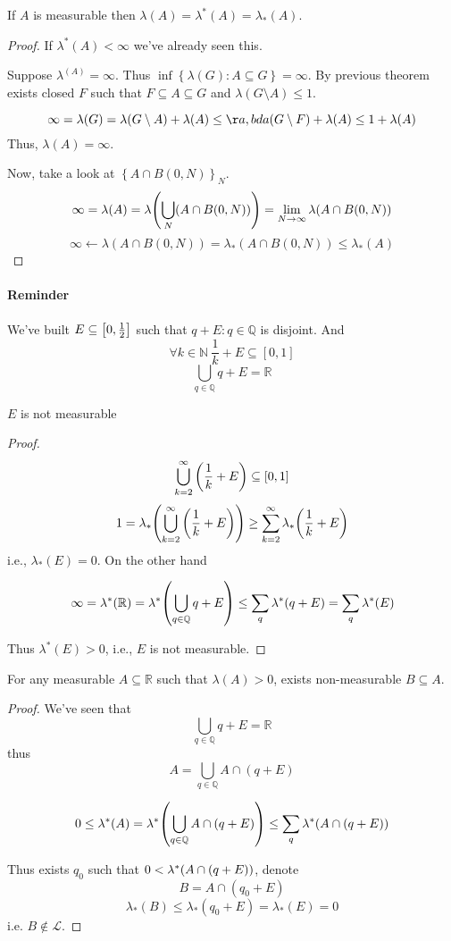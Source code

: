 \begin{prop}
	If $A$ is measurable then $\lambda(A)=\lambda^*(A)=\lambda_*(A)$.
	\begin{proof}
		If $\lambda^*(A)<\infty$ we've already seen this.
		
		Suppose $\lambda^(A)=\infty$. Thus $\inf \left\{  \lambda(G) : A\subseteq G \right\} =\infty$. By previous theorem exists closed $F$ such that $F\subseteq A\subseteq G$ and $\lambda(G\setminus A) \leq 1$. 
		
		
		$$\infty = \lambda(G) = \lambda(G\setminus A) + \lambda(A) \leq \aa,bda(G\setminus F) + \lambda(A) \leq 1+\lambda(A)$$
		Thus, $\lambda(A)=\infty$.
		
		Now, take a look at $\left\{ A\cap B(0,N)   \right\}_{N}$. 
		$$\infty = \lambda(A) = \lambda\qty(\bigcup_N (A\cap B(0,N))) = \lim_{N\to \infty} \lambda\qty(A\cap B(0,N)) $$
		$$\infty \leftarrow \lambda(A\cap B(0,N)) = \lambda_*(A\cap B(0,N)) \leq \lambda_*(A)$$
	\end{proof}
\end{prop}

\paragraph{Reminder}
We've built $E\subseteq \qty[0,\frac{1}{2}]$ such that $q+E : q\in \mathbb{Q}$ is disjoint. And 
$$\forall k \in \mathbb{N} \: \frac{1}{k} + E \subseteq[0,1]$$
$$\bigcup_{q\in \mathbb{Q} } q+E=\mathbb{R}$$

\begin{prop}
	$E$ is not measurable
	\begin{proof}
		$$\bigcup_{k=2 }^\infty \qty(\frac{1}{k}+E)\subseteq [0,1]$$
		$$1 = \lambda_*\qty(\bigcup_{k=2 }^\infty \qty(\frac{1}{k}+E)) \geq \sum_{k=2}^\infty \lambda_*\qty(\frac{1}{k}+E) $$
		i.e., $\lambda_*(E)= 0$.
		On the other hand
		
		$$\infty = \lambda^*(\mathbb{R}) = \lambda^*\qty(\bigcup_{q\in \mathbb{Q} } q+E) \leq \sum_q \lambda^*(q+E) = \sum_q \lambda^*(E)$$
		
		Thus $\lambda^*(E) > 0$, i.e., $E$ is not measurable.
	\end{proof}
\end{prop}

\begin{prop}
	For any measurable $A\subseteq \mathbb{R}$ such that $\lambda(A)>0$, exists non-measurable $B\subseteq A$.
	
	\begin{proof}
		We've seen that
		$$\bigcup_{q\in \mathbb{Q} } q+E=\mathbb{R}$$
		thus 
		$$A = \bigcup_{q\in \mathbb{Q} } A\cap (q+E)$$
		
		$$0 \leq \lambda^*(A) = \lambda^*\qty(\bigcup_{q\in \mathbb{Q} } A\cap (q+E)) \leq \sum_q \lambda^*(A \cap (q+E))$$
		
		Thus  exists $q_0$ such that $0 < \lambda^*\qty(A\cap (q+E))$, denote
		$$B = A \cap (q_0+E)$$
		$$\lambda_*(B) \leq \lambda_*(q_0+E) = \lambda_*(E) = 0$$
		i.e. $B\notin \mathcal{L}$.
		
	\end{proof}
\end{prop}


